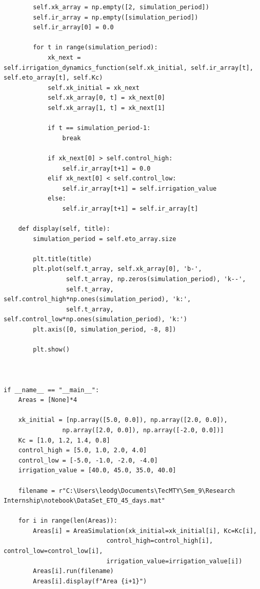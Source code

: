 \documentclass[12pt]{article}
\begin{document}
\begin{lstlisting}
        self.xk_array = np.empty([2, simulation_period])
        self.ir_array = np.empty([simulation_period])
        self.ir_array[0] = 0.0
        
        for t in range(simulation_period):
            xk_next = self.irrigation_dynamics_function(self.xk_initial, self.ir_array[t], self.eto_array[t], self.Kc)
            self.xk_initial = xk_next
            self.xk_array[0, t] = xk_next[0]
            self.xk_array[1, t] = xk_next[1]
            
            if t == simulation_period-1:
                break
            
            if xk_next[0] > self.control_high:
                self.ir_array[t+1] = 0.0
            elif xk_next[0] < self.control_low:
                self.ir_array[t+1] = self.irrigation_value
            else:
                self.ir_array[t+1] = self.ir_array[t]
    
    def display(self, title):
        simulation_period = self.eto_array.size
        
        plt.title(title)
        plt.plot(self.t_array, self.xk_array[0], 'b-', 
                 self.t_array, np.zeros(simulation_period), 'k--',
                 self.t_array, self.control_high*np.ones(simulation_period), 'k:',
                 self.t_array, self.control_low*np.ones(simulation_period), 'k:')
        plt.axis([0, simulation_period, -8, 8])
        
        plt.show()



if __name__ == "__main__":
    Areas = [None]*4

    xk_initial = [np.array([5.0, 0.0]), np.array([2.0, 0.0]),
                np.array([2.0, 0.0]), np.array([-2.0, 0.0])]
    Kc = [1.0, 1.2, 1.4, 0.8]
    control_high = [5.0, 1.0, 2.0, 4.0]
    control_low = [-5.0, -1.0, -2.0, -4.0]
    irrigation_value = [40.0, 45.0, 35.0, 40.0]

    filename = r"C:\Users\leodg\Documents\TecMTY\Sem_9\Research Internship\notebook\DataSet_ETO_45_days.mat"

    for i in range(len(Areas)):
        Areas[i] = AreaSimulation(xk_initial=xk_initial[i], Kc=Kc[i],
                            control_high=control_high[i], control_low=control_low[i],
                            irrigation_value=irrigation_value[i])
        Areas[i].run(filename)
        Areas[i].display(f"Area {i+1}")

\end{lstlisting}
\end{document}
